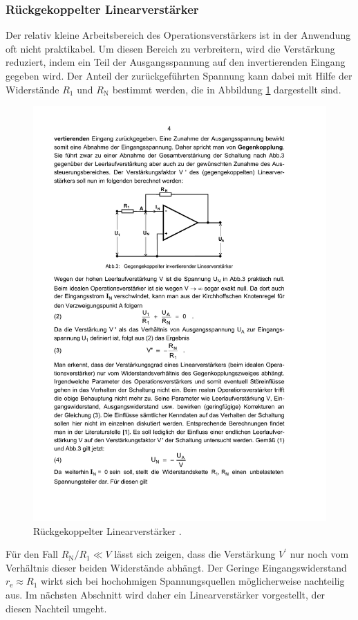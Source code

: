 \subsubsection{Rückgekoppelter Linearverstärker}
\label{subsubsec:rueck-linearverstärker}
Der relativ kleine Arbeitsbereich des Operationsverstärkers ist in der
Anwendung oft nicht praktikabel. Um diesen Bereich zu verbreitern, wird die
Verstärkung reduziert, indem ein Teil der Ausgangsspannung auf den
invertierenden Eingang gegeben wird.
Der Anteil der zurückgeführten Spannung kann dabei mit Hilfe der Widerstände
$R_1$ und $R_\text{N}$ bestimmt werden, die in Abbildung \ref{fig:linear}
dargestellt sind.
\begin{figure}
    \centering
    \includegraphics[width=0.5\linewidth]{img/linearverstaerker.pdf}
    \caption{Rückgekoppelter Linearverstärker \cite{V51}.}
    \label{fig:linear}
\end{figure}
Für den Fall $R_\text{N}/R_1 \ll V$
lässt sich zeigen, dass die Verstärkung $V^\prime$ nur noch vom Verhältnis
dieser beiden Widerstände abhängt.
Der Geringe Eingangswiderstand $r_\text{e} \approx R_1$ wirkt sich bei
hochohmigen Spannungsquellen möglicherweise nachteilig aus. Im nächsten
Abschnitt wird daher ein Linearverstärker vorgestellt, der diesen Nachteil
umgeht.

